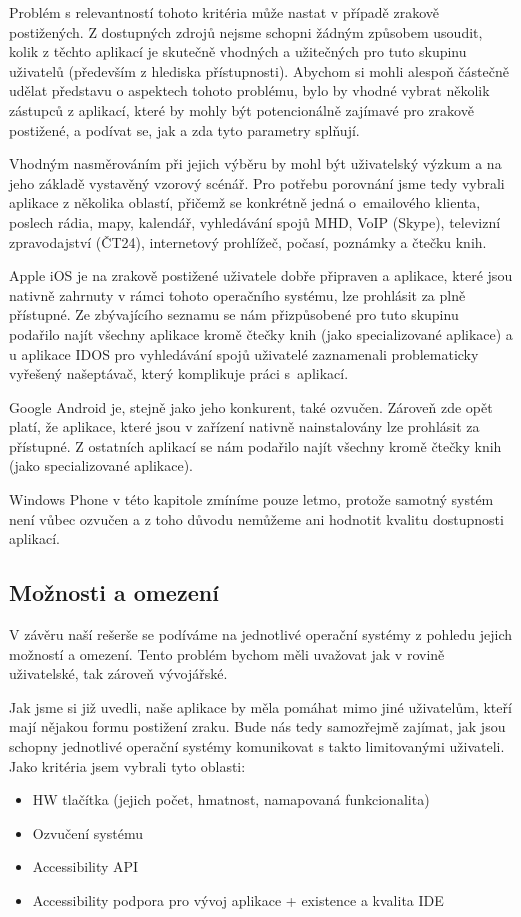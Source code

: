 \documentclass[thesis=M,czech]{FITthesis}[2012/06/26]
\begin{document}
Problém s relevantností tohoto kritéria může nastat v případě zrakově postižených. Z dostupných zdrojů nejsme schopni žádným způsobem usoudit, kolik z těchto aplikací je skutečně vhodných a užitečných pro tuto skupinu uživatelů (především z hlediska přístupnosti). Abychom si mohli alespoň částečně udělat představu o aspektech tohoto problému, bylo by vhodné vybrat několik zástupců z aplikací, které by mohly být potencionálně zajímavé pro zrakově postižené, a podívat se, jak a zda tyto parametry splňují.

Vhodným nasměrováním při jejich výběru by mohl být uživatelský výzkum a na jeho základě vystavěný vzorový scénář. Pro potřebu porovnání jsme tedy vybrali aplikace z několika oblastí, přičemž se konkrétně jedná o~emailového klienta, poslech rádia, mapy, kalendář, vyhledávání spojů MHD, VoIP (Skype), televizní zpravodajství (ČT24), internetový prohlížeč, počasí, poznámky a čtečku knih.

Apple iOS je na zrakově postižené uživatele dobře připraven a aplikace, které jsou nativně zahrnuty v rámci tohoto operačního systému\cite{ios_apps}, lze prohlásit za plně přístupné. Ze zbývajícího seznamu se nám přizpůsobené pro tuto skupinu podařilo najít všechny aplikace kromě čtečky knih (jako specializované aplikace) a u aplikace IDOS pro vyhledávání spojů uživatelé zaznamenali problematicky vyřešený našeptávač, který komplikuje práci s~aplikací.

Google Android je, stejně jako jeho konkurent, také ozvučen. Zároveň zde opět platí, že aplikace, které jsou v zařízení nativně nainstalovány lze prohlásit za přístupné\cite{pristupnost}\cite{blind_apps}. Z ostatních aplikací se nám podařilo najít všechny kromě čtečky knih (jako specializované aplikace).

Windows Phone v této kapitole zmíníme pouze letmo, protože samotný systém není vůbec ozvučen a z toho důvodu nemůžeme ani hodnotit kvalitu dostupnosti aplikací.

\subsection{Možnosti a omezení}
V závěru naší rešerše se podíváme na jednotlivé operační systémy z pohledu jejich možností a omezení. Tento problém bychom měli uvažovat jak v rovině uživatelské, tak zároveň vývojářské.

Jak jsme si již uvedli, naše aplikace by měla pomáhat mimo jiné uživatelům, kteří mají nějakou formu postižení zraku. Bude nás tedy samozřejmě zajímat, jak jsou schopny jednotlivé operační systémy komunikovat s takto limitovanými uživateli. Jako kritéria jsem vybrali tyto oblasti:
\begin{itemize}
\item    HW tlačítka (jejich počet, hmatnost, namapovaná funkcionalita)
\item    Ozvučení systému
\item    Accessibility API
\item    Accessibility podpora pro vývoj aplikace + existence a kvalita IDE
\end{itemize}
\end{document}
